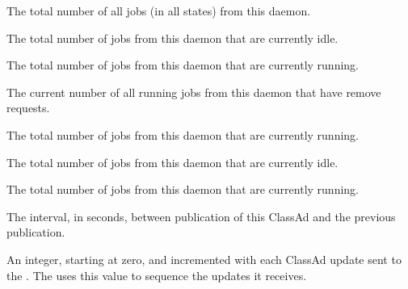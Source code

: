 \begin{description}
\item[\AdAttr{TotalJobAds}:] The total number of all jobs (in all 
  states) from this  daemon.

\item[\AdAttr{TotalLocalIdleJobs}:] The total number of 
    jobs from this
   daemon that are currently idle.

\item[\AdAttr{TotalLocalRunningJobs}:] The total number of 
    jobs from this
   daemon that are currently running.

\item[\AdAttr{TotalRemovedJobs}:] The current number of all running jobs
  from this  daemon that have remove requests.

\item[\AdAttr{TotalRunningJobs}:] The total number of jobs from this
   daemon that are currently running.

\item[\AdAttr{TotalSchedulerIdleJobs}:] The total number of 
    jobs from this
   daemon that are currently idle.

\item[\AdAttr{TotalSchedulerRunningJobs}:] The total number of 
    jobs from this
   daemon that are currently running.

\item[\AdAttr{UpdateInterval}:] The interval, in seconds,
  between publication of this  ClassAd and
  the previous publication.

\item[\AdAttr{UpdateSequenceNumber}:] An integer, starting at zero,
  and incremented with each ClassAd update sent to the .
  The  uses this value to sequence the updates it
  receives.


\end{description}
